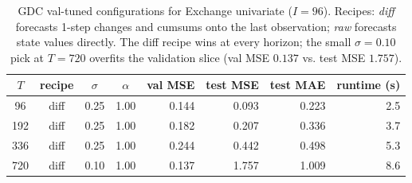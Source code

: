 \begin{table}[t]
\centering
\caption{GDC val-tuned configurations for Exchange univariate ($I=96$). Recipes: \emph{diff} forecasts 1-step changes and cumsums onto the last observation; \emph{raw} forecasts state values directly. The diff recipe wins at every horizon; the small $\sigma=0.10$ pick at $T=720$ overfits the validation slice (val MSE $0.137$ vs. test MSE $1.757$).}
\label{tab:exchange_picks}
\begin{tabular}{c c c c r r r r}
\toprule
$T$ & recipe & $\sigma$ & $\alpha$ & val MSE & test MSE & test MAE & runtime (s) \\
\midrule
 96 & diff & 0.25 & 1.00 & 0.144 & 0.093 & 0.223 &  2.5 \\
192 & diff & 0.25 & 1.00 & 0.182 & 0.207 & 0.336 &  3.7 \\
336 & diff & 0.25 & 1.00 & 0.244 & 0.442 & 0.498 &  5.3 \\
720 & diff & 0.10 & 1.00 & 0.137 & 1.757 & 1.009 &  8.6 \\
\bottomrule
\end{tabular}
\end{table}


